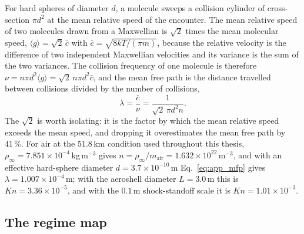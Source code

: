 For hard spheres of diameter $d$, a molecule sweeps a collision cylinder of cross-section $\pi d^2$ at the mean relative speed of the encounter. The mean relative speed of two molecules drawn from a Maxwellian is $\sqrt{2}$ times the mean molecular speed, $\langle g\rangle = \sqrt{2}\,\bar{c}$ with $\bar{c} = \sqrt{8kT/(\pi m)}$, because the relative velocity is the difference of two independent Maxwellian velocities and its variance is the sum of the two variances. The collision frequency of one molecule is therefore $\nu = n\pi d^2\langle g\rangle = \sqrt{2}\,n\pi d^2\bar{c}$, and the mean free path is the distance travelled between collisions divided by the number of collisions,
\begin{equation}
    \lambda = \frac{\bar{c}}{\nu} = \frac{1}{\sqrt{2}\,\pi d^2 n} .
    \label{eq:app_mfp}
\end{equation}
The $\sqrt2$ is worth isolating: it is the factor by which the mean relative speed exceeds the mean speed, and dropping it overestimates the mean free path by $41\,\%$. For air at the $51.8$\,km condition used throughout this thesis, $\rho_\infty = 7.851\times10^{-4}$\,kg\,m$^{-3}$ gives $n = \rho_\infty/m_{\mathrm{air}} = 1.632\times10^{22}$\,m$^{-3}$, and with an effective hard-sphere diameter $d = 3.7\times10^{-10}$\,m Eq.~\eqref{eq:app_mfp} gives $\lambda = 1.007\times10^{-4}$\,m; with the aeroshell diameter $L = 3.0$\,m this is $Kn = 3.36\times10^{-5}$, and with the $0.1$\,m shock-standoff scale it is $Kn = 1.01\times10^{-3}$.

\subsection{The regime map}

